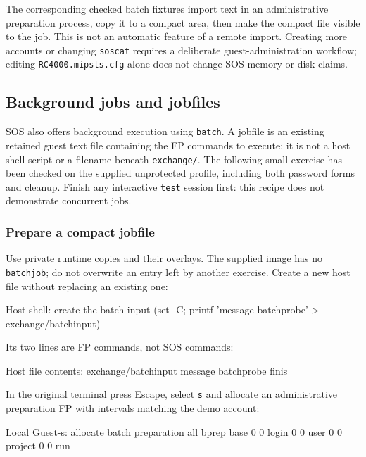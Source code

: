 The corresponding checked batch fixtures import text in an administrative
preparation process, copy it to a compact area, then make the compact file
visible to the job. This is not an automatic feature of a remote import.
Creating more accounts or changing \texttt{soscat} requires a deliberate
guest-administration workflow; editing \texttt{RC4000.mipsts.cfg} alone
does not change SOS memory or disk claims.

\subsection{Background jobs and jobfiles}\label{mips-ts-batch-jobs}

SOS also offers background execution using \texttt{batch}. A jobfile is an
existing retained guest text file containing the FP commands to execute;
it is not a host shell script or a filename beneath \texttt{exchange/}.
The following small exercise has been checked on the supplied unprotected
profile, including both password forms and cleanup. Finish any interactive
\texttt{test} session first: this recipe does not demonstrate concurrent jobs.

\subsubsection{Prepare a compact jobfile}\label{mips-ts-batch-prepare}

Use private runtime copies and their overlays. The supplied image has no
\texttt{batchjob}; do not overwrite an entry left by another exercise.
Create a new host file without replacing an existing one:

\begin{commandexample}[language=sh]{Host shell: create the batch input}
(set -C; printf 'message batchprobe\nfinis\n' > exchange/batchinput)
\end{commandexample}

Its two lines are FP commands, not SOS commands:

\begin{commandexample}{Host file contents: exchange/batchinput}
message batchprobe
finis
\end{commandexample}

In the original terminal press Escape, select \texttt{s} and allocate an
administrative preparation FP with intervals matching the demo account:

\begin{commandexample}{Local Guest-s: allocate batch preparation}
all bprep base 0 0 login 0 0 user 0 0 project 0 0 run
\end{commandexample}

